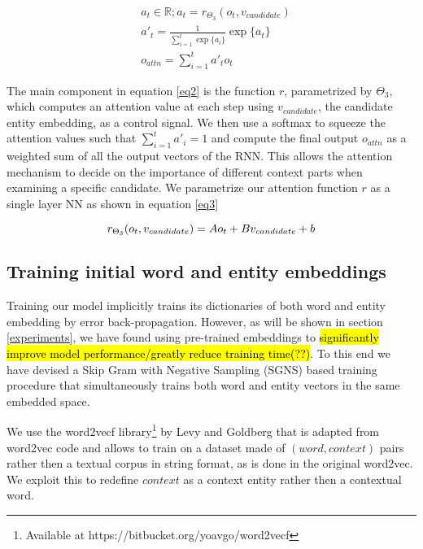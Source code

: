 \documentclass[11pt]{article}
\begin{document}
	\begin{equation}
	\label{eq2}
	\begin{aligned}
	& a_t \in \mathbb{R}; a_t=r_{\Theta_3}(o_t, v_{candidate}) \\
	& a'_t  = \frac{1}{\sum_{i=1}^{t} \exp\{a_i\}} \exp \{a_t\} \\
	& o_{attn}=\sum_{i=1}^{t} a'_t o_t
	\end{aligned}
	\end{equation}
	
	The main component in equation \ref{eq2} is the function $r$, parametrized by $\Theta_3$, which computes an attention value at each step using $v_{candidate}$, the candidate entity embedding, as a control signal. We then use a softmax to squeeze the attention values such that $\sum_{i=1}^{t} a'_i = 1$ and compute the final output $o_{attn}$ as a weighted sum of all the output vectors of the RNN. This allows the attention mechanism to decide on the importance of different context parts when examining a specific candidate. We parametrize our attention function $r$ as a single layer NN as shown in equation \ref{eq3}
	
	\begin{equation}
	\label{eq3}
	r_{\Theta_3}(o_t, v_{candidate}) = Ao_t + Bv_{candidate} + b \\
	\end{equation}
	
	\subsection{Training initial word and entity embeddings}
	
	Training our model implicitly trains its dictionaries of both word and entity embedding by error back-propagation. However, as will be shown in section \ref{experiments}, we have found using pre-trained embeddings to \hl{significantly improve model performance/greatly reduce training time(??)}. To this end we have devised a Skip Gram with Negative Sampling (SGNS) \cite{mikolov2013distributed} based training procedure that simultaneously trains both word and entity vectors in the same embedded space.
	
	We use the word2vecf library\footnote{Available at https://bitbucket.org/yoavgo/word2vecf} by Levy and Goldberg \cite{levy2014dependency} that is adapted from word2vec code and allows to train on a dataset made of $(word,context)$ pairs rather then a textual corpus in string format, as is done in the original word2vec. We exploit this to redefine $context$ as a context entity rather then a contextual word. 
	
\end{document}
